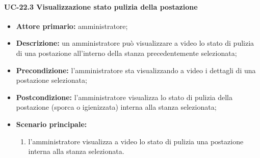 \paragraph{UC-22.3 Visualizzazione stato pulizia della postazione} 
\begin{itemize}
    \item \textbf{Attore primario:} amministratore;
    \item \textbf{Descrizione:} un amministratore pu\`{o} visualizzare a video lo stato di pulizia di una postazione all'interno della stanza precedentemente selezionata;
    \item \textbf{Precondizione:} l'amministratore sta visualizzando a video i dettagli di una postazione selezionata;
    \item \textbf{Postcondizione:} l'amministratore visualizza lo stato di pulizia della postazione (sporca o igienizzata) interna alla stanza selezionata;
    \item \textbf{Scenario principale:}
    \begin{enumerate}
        \item l'amministratore visualizza a video lo stato di pulizia una postazione interna alla stanza selezionata.
    \end{enumerate}
\end{itemize}

